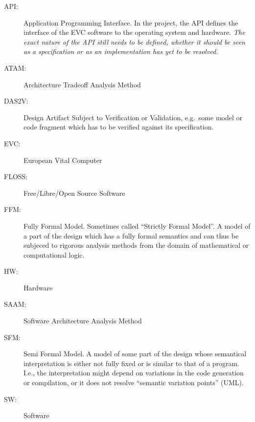 \documentclass{template/openetcs_report}
\begin{document}
\begin{description}
\item[API:] Application Programming Interface. In the project, the API defines 
the interface of the EVC software to the operating system and hardware. \textit{The
exact nature of the API still needs to be defined, whether it should be seen as
a specification or as an implementation has yet to be resolved.}
\item[ATAM:] Architecture Tradeoff Analysis Method
\item [DAS2V:] Design Artifact Subject to Verification or Validation, e.g.\ 
some model or code fragment which has to be verified against its specification.
\item[EVC:] European Vital Computer
\item[FLOSS:] Free/Libre/Open Source Software
\item[FFM:] Fully Formal Model. Sometimes called ``Strictly Formal Model''. 
A model of a part of the design which has a
fully formal semantics and can thus be subjeced to rigorous analysis methods 
from the domain of mathematical or computational logic.
\item[HW:] Hardware
\item[SAAM:] Software Architecture Analysis Method 
\item[SFM:] Semi Formal Model. A model of some part of the design whose semantical
interpretation is either not fully fixed or is similar to that of a program. I.e., 
the interpretation might depend on variations in the code generation or compilation, 
or it does not resolve ``semantic variation points'' (UML).  
\item[SW:] Software
\end{description}






\nocite{*}
\end{document}
